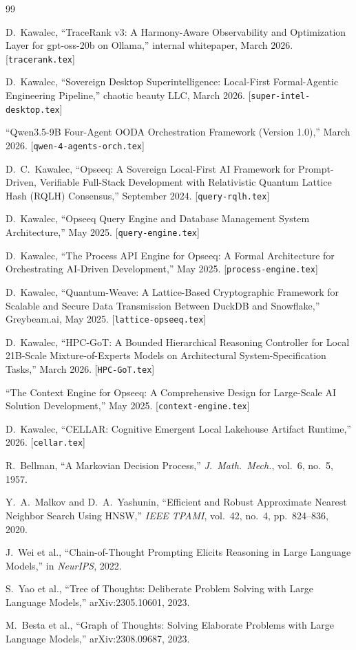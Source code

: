 \documentclass[11pt]{article}
\theoremstyle{remark}
\begin{document}
\begin{thebibliography}{99}

D.~Kawalec, ``TraceRank v3: A Harmony-Aware Observability and Optimization Layer for gpt-oss-20b on Ollama,'' internal whitepaper, March 2026. [\texttt{tracerank.tex}]

D.~Kawalec, ``Sovereign Desktop Superintelligence: Local-First Formal-Agentic Engineering Pipeline,'' chaotic beauty LLC, March 2026. [\texttt{super-intel-desktop.tex}]

``Qwen3.5-9B Four-Agent OODA Orchestration Framework (Version 1.0),'' March 2026. [\texttt{qwen-4-agents-orch.tex}]

D.~C.~Kawalec, ``Opseeq: A Sovereign Local-First AI Framework for Prompt-Driven, Verifiable Full-Stack Development with Relativistic Quantum Lattice Hash (RQLH) Consensus,'' September 2024. [\texttt{query-rqlh.tex}]

D.~Kawalec, ``Opseeq Query Engine and Database Management System Architecture,'' May 2025. [\texttt{query-engine.tex}]

D.~Kawalec, ``The Process API Engine for Opseeq: A Formal Architecture for Orchestrating AI-Driven Development,'' May 2025. [\texttt{process-engine.tex}]

D.~Kawalec, ``Quantum-Weave: A Lattice-Based Cryptographic Framework for Scalable and Secure Data Transmission Between DuckDB and Snowflake,'' Greybeam.ai, May 2025. [\texttt{lattice-opseeq.tex}]

D.~Kawalec, ``HPC-GoT: A Bounded Hierarchical Reasoning Controller for Local 21B-Scale Mixture-of-Experts Models on Architectural System-Specification Tasks,'' March 2026. [\texttt{HPC-GoT.tex}]

``The Context Engine for Opseeq: A Comprehensive Design for Large-Scale AI Solution Development,'' May 2025. [\texttt{context-engine.tex}]

D.~Kawalec, ``CELLAR: Cognitive Emergent Local Lakehouse Artifact Runtime,'' 2026. [\texttt{cellar.tex}]

R.~Bellman, ``A Markovian Decision Process,'' \emph{J.~Math.~Mech.}, vol.~6, no.~5, 1957.

Y.~A.~Malkov and D.~A.~Yashunin, ``Efficient and Robust Approximate Nearest Neighbor Search Using HNSW,'' \emph{IEEE TPAMI}, vol.~42, no.~4, pp.~824--836, 2020.

J.~Wei et al., ``Chain-of-Thought Prompting Elicits Reasoning in Large Language Models,'' in \emph{NeurIPS}, 2022.

S.~Yao et al., ``Tree of Thoughts: Deliberate Problem Solving with Large Language Models,'' arXiv:2305.10601, 2023.

M.~Besta et al., ``Graph of Thoughts: Solving Elaborate Problems with Large Language Models,'' arXiv:2308.09687, 2023.

\end{thebibliography}
\end{document}
